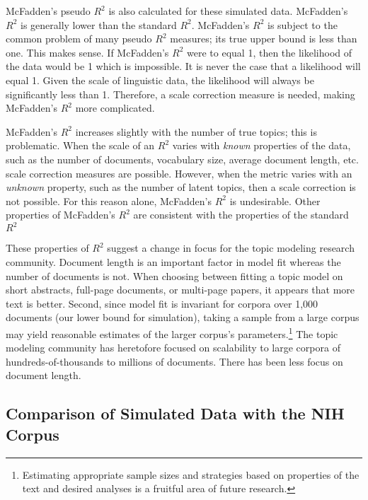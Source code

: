 \documentclass[conference,final,]{IEEEtran}
\begin{document}
McFadden's pseudo \(R^2\) is also calculated for these simulated data.
McFadden's \(R^2\) is generally lower than the standard \(R^2\).
McFadden's \(R^2\) is subject to the common problem of many pseudo
\(R^2\) measures; its true upper bound is less than one. This makes
sense. If McFadden's \(R^2\) were to equal 1, then the likelihood of the
data would be 1 which is impossible. It is never the case that a
likelihood will equal 1. Given the scale of linguistic data, the
likelihood will always be significantly less than 1. Therefore, a scale
correction measure is needed, making McFadden's \(R^2\) more
complicated.

McFadden's \(R^2\) increases slightly with the number of true topics;
this is problematic. When the scale of an \(R^2\) varies with
\textit{known} properties of the data, such as the number of documents,
vocabulary size, average document length, etc. scale correction measures
are possible. However, when the metric varies with an \textit{unknown}
property, such as the number of latent topics, then a scale correction
is not possible. For this reason alone, McFadden's \(R^2\) is
undesirable. Other properties of McFadden's \(R^2\) are consistent with
the properties of the standard \(R^2\)

These properties of \(R^2\) suggest a change in focus for the topic
modeling research community. Document length is an important factor in
model fit whereas the number of documents is not. When choosing between
fitting a topic model on short abstracts, full-page documents, or
multi-page papers, it appears that more text is better. Second, since
model fit is invariant for corpora over 1,000 documents (our lower bound
for simulation), taking a sample from a large corpus may yield
reasonable estimates of the larger corpus's parameters.\footnote{Estimating
  appropriate sample sizes and strategies based on properties of the
  text and desired analyses is a fruitful area of future research.} The
topic modeling community has heretofore focused on scalability to large
corpora of hundreds-of-thousands to millions of documents. There has
been less focus on document length.

\hypertarget{comparison-of-simulated-data-with-the-nih-corpus}{%
\subsection{Comparison of Simulated Data with the NIH
Corpus}\label{comparison-of-simulated-data-with-the-nih-corpus}}
\end{document}
